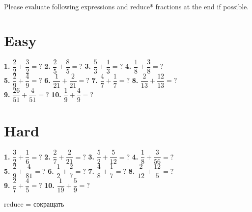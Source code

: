 \documentclass[a4paper, 12pt]{article}
\begin{document}
	{\large Please evaluate following expressions and reduce* fractions at the end if possible.}	
	
	\section* {{\Large Easy}}
	
	{\Large \textbf{1.} $\dfrac{2}{2}+\dfrac{3}{2} = ?$  \hspace{0.6cm}
		   \textbf{2.} $\dfrac{2}{5}+\dfrac{8}{5} = ?$  \hspace{0.6cm}
		   \textbf{3.} $\dfrac{5}{3}+\dfrac{1}{3} = ?$  \hspace{0.6cm}
		   \textbf{4.} $\dfrac{1}{8}+\dfrac{3}{8} = ?$  \\ [0.6cm]
		   \textbf{5.} $\dfrac{2}{9}+\dfrac{4}{9} = ?$  \hspace{0.6cm}
		   \textbf{6.} $\dfrac{1}{21}+\dfrac{2}{21} = ?$ \hspace{0.6cm}
		   \textbf{7.} $\dfrac{4}{7}+\dfrac{1}{7} = ?$  \hspace{0.6cm}
		   \textbf{8.} $\dfrac{2}{13}+\dfrac{12}{13} = ?$  \\ [0.6cm]
		   \textbf{9.} $\dfrac{26}{51}+\dfrac{4}{51} = ?$ \hspace{0.6cm}
		   \textbf{10.} $\dfrac{1}{9}+\dfrac{4}{9} = ?$}
	
	\section* {{\Large Hard}}
	
	{\Large \textbf{1.} $\dfrac{3}{2}+\dfrac{1}{6} = ?$ \hspace{0.6cm}
		   \textbf{2.} $\dfrac{2}{7}+\dfrac{2}{21} = ?$ \hspace{0.6cm}
		   \textbf{3.} $\dfrac{5}{2}+\dfrac{5}{12} = ?$ \hspace{0.6cm}
		   \textbf{4.} $\dfrac{1}{8}+\dfrac{3}{56} = ?$ \\ [0.6cm]
		   \textbf{5.} $\dfrac{2}{9}+\dfrac{4}{81} = ?$ \hspace{0.6cm}
		   \textbf{6.} $\dfrac{1}{2}+\dfrac{2}{7} = ?$ \hspace{0.6cm}
		   \textbf{7.} $\dfrac{4}{8}+\dfrac{1}{7} = ?$ \hspace{0.6cm}
		   \textbf{8.} $\dfrac{2}{12}+\dfrac{12}{5} = ?$ \\ [0.6cm]
		   \textbf{9.} $\dfrac{2}{7}+\dfrac{4}{5} = ?$  \hspace{0.6cm}
		   \textbf{10.} $\dfrac{1}{19}+\dfrac{5}{9} = ?$ \\ [0.6cm]}
	   
	 {\large *reduce = сокращать}
		
\end{document}
